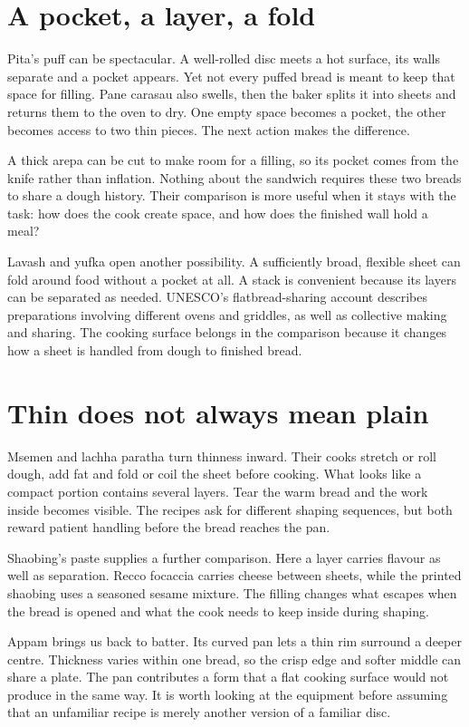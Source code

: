 \section{A pocket, a layer, a fold}
Pita's puff can be spectacular. A well-rolled disc meets a hot surface, its walls separate and a pocket appears. Yet not every puffed bread is meant to keep that space for filling. Pane carasau also swells, then the baker splits it into sheets and returns them to the oven to dry. One empty space becomes a pocket, the other becomes access to two thin pieces. The next action makes the difference.\citep{aboodpita,carasaurecipe}

A thick arepa can be cut to make room for a filling, so its pocket comes from the knife rather than inflation. Nothing about the sandwich requires these two breads to share a dough history. Their comparison is more useful when it stays with the task: how does the cook create space, and how does the finished wall hold a meal?

Lavash and yufka open another possibility. A sufficiently broad, flexible sheet can fold around food without a pocket at all. A stack is convenient because its layers can be separated as needed. UNESCO's flatbread-sharing account describes preparations involving different ovens and griddles, as well as collective making and sharing. The cooking surface belongs in the comparison because it changes how a sheet is handled from dough to finished bread.\citep{lavash,sharing}

\section{Thin does not always mean plain}
Msemen and lachha paratha turn thinness inward. Their cooks stretch or roll dough, add fat and fold or coil the sheet before cooking. What looks like a compact portion contains several layers. Tear the warm bread and the work inside becomes visible. The recipes ask for different shaping sequences, but both reward patient handling before the bread reaches the pan.\citep{benmsemen,rakslachha06}

Shaobing's paste supplies a further comparison. Here a layer carries flavour as well as separation. Recco focaccia carries cheese between sheets, while the printed shaobing uses a seasoned sesame mixture. The filling changes what escapes when the bread is opened and what the cook needs to keep inside during shaping.\citep{linliushaobing07,reccofocaccia}

Appam brings us back to batter. Its curved pan lets a thin rim surround a deeper centre. Thickness varies within one bread, so the crisp edge and softer middle can share a plate. The pan contributes a form that a flat cooking surface would not produce in the same way. It is worth looking at the equipment before assuming that an unfamiliar recipe is merely another version of a familiar disc.\citep{familiarappam06}

